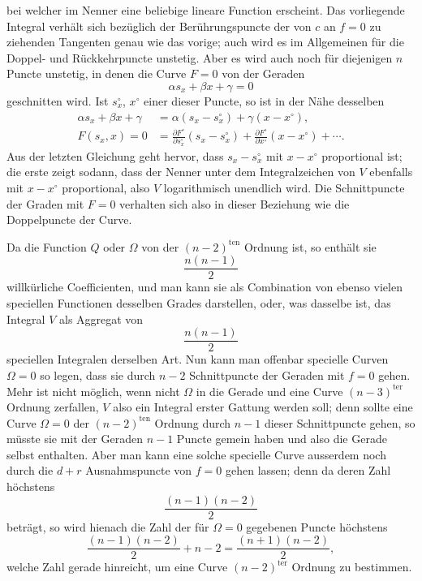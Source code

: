 \documentclass[10pt]{article}
\begin{document}

bei welcher im Nenner eine beliebige lineare Function erscheint. Das vorliegende Integral verhält sich bezüglich der Berührungspuncte der von $c$ an $f=0$ zu ziehenden Tangenten genau wie das vorige; auch wird es im Allgemeinen für die Doppel- und Rückkehrpuncte unstetig. Aber es wird auch noch für diejenigen $n$ Puncte unstetig, in denen die Curve $F=0$ von der Geraden
\[
\alpha s_x+\beta x+\gamma=0
\]
geschnitten wird. Ist $s_x^\circ$, $x^\circ$ einer dieser Puncte, so ist in der Nähe desselben
\[
\begin{aligned}
\alpha s_x+\beta x+\gamma&=\alpha(s_x-s_x^\circ)+\gamma(x-x^\circ),\\
F(s_x,x)=0&=\frac{\partial F^\circ}{\partial s_x^\circ}(s_x-s_x^\circ)+\frac{\partial F^\circ}{\partial x^\circ}(x-x^\circ)+\cdots .
\end{aligned}
\]
Aus der letzten Gleichung geht hervor, dass $s_x-s_x^\circ$ mit $x-x^\circ$ proportional ist; die erste zeigt sodann, dass der Nenner unter dem Integralzeichen von $V$ ebenfalls mit $x-x^\circ$ proportional, also $V$ logarithmisch unendlich wird. Die Schnittpuncte der Graden mit $F=0$ verhalten sich also in dieser Beziehung wie die Doppelpuncte der Curve.

Da die Function $Q$ oder $\Omega$ von der $(n-2)^{\mathrm{ten}}$ Ordnung ist, so enthält sie
\[
\frac{n(n-1)}{2}
\]
willkürliche Coefficienten, und man kann sie als Combination von ebenso vielen speciellen Functionen desselben Grades darstellen, oder, was dasselbe ist, das Integral $V$ als Aggregat von
\[
\frac{n(n-1)}{2}
\]
speciellen Integralen derselben Art. Nun kann man offenbar specielle Curven $\Omega=0$ so legen, dass sie durch $n-2$ Schnittpuncte der Geraden mit $f=0$ gehen. Mehr ist nicht möglich, wenn nicht $\Omega$ in die Gerade und eine Curve $(n-3)^{\mathrm{ter}}$ Ordnung zerfallen, $V$ also ein Integral erster Gattung werden soll; denn sollte eine Curve $\Omega=0$ der $(n-2)^{\mathrm{ten}}$ Ordnung durch $n-1$ dieser Schnittpuncte gehen, so müsste sie mit der Geraden $n-1$ Puncte gemein haben und also die Gerade selbst enthalten. Aber man kann eine solche specielle Curve ausserdem noch durch die $d+r$ Ausnahmspuncte von $f=0$ gehen lassen; denn da deren Zahl höchstens
\[
\frac{(n-1)(n-2)}{2}
\]
beträgt, so wird hienach die Zahl der für $\Omega=0$ gegebenen Puncte höchstens
\[
\frac{(n-1)(n-2)}{2}+n-2=\frac{(n+1)(n-2)}{2},
\]
welche Zahl gerade hinreicht, um eine Curve $(n-2)^{\mathrm{ter}}$ Ordnung zu bestimmen.
\end{document}

